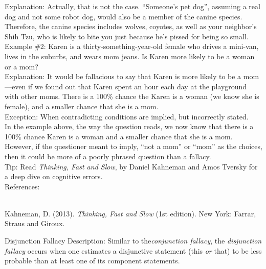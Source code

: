 \documentclass[a4paper,12pt,single,pdftex]{scrartcl}
\begin{document}
    
      Explanation: Actually, that is not the case.  “Someone’s pet dog”, assuming a real dog and not some robot dog, would also be a member of the canine species.  Therefore, the canine species includes wolves,  coyotes, as well as your neighbor’s Shih Tzu, who is likely to bite you just because he’s pissed for being so small.
    \\

    
      Example \#2: Karen is a thirty-something-year-old female who drives a mini-van, lives in the suburbs, and wears mom jeans. Is Karen more likely to be a woman or a mom?
    \\

    
      Explanation: It would be fallacious to say that Karen is more likely to be a mom—even if we found out that Karen spent an hour each day at the playground with other moms. There is a 100\% chance the Karen is a woman (we know she is female), and a smaller chance that she is a mom.
    \\

    
      Exception: When contradicting conditions are implied, but incorrectly stated.
    \\

    
      In the example above, the way the question reads, we now know that there is a 100\% chance Karen is a woman and a smaller chance that she is a mom. However, if the questioner meant to imply, “not a mom” or “mom” as the choices, then it could be more of a poorly phrased question than a fallacy.
    \\

    
      Tip: Read {\em Thinking, Fast and Slow}, by Daniel Kahneman and Amos Tversky for a deep dive on cognitive errors.
    \\

    References:

    
      
        
      \\

      
        
          Kahneman, D. (2013). {\it Thinking, Fast and Slow} (1st edition). New York: Farrar, Straus and Giroux.
        
      
    
  

Disjunction Fallacy
    Description: Similar to the{\em  {\it conjunction fallacy}}, the {\em disjunction fallacy} occurs when one estimates a disjunctive statement (this {\em or} that) to be less probable than at least one of its component statements.
\end{document}
